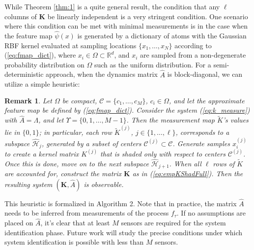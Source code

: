 \documentclass[letterpaper,12pt,peerreviewca,draftcls]{IEEEtran}
\newtheorem{remark}{Remark}
\newcommand{\R}{\mathbb{R}}
\newcommand{\fspace}{\mathcal{H}}
\newcommand{\fmap}{\psi}
\newcommand{\empK}{\ensuremath{K}}
\newcommand{\dom}{\Omega}
\newcommand{\sampSetLong}{\{x_1, \dots, x_{\nsamp}\}}
\newcommand{\nsamp}{N}
\newcommand{\ncent}{M}
\newcommand{\shCent}{\mathcal{C}}
\newcommand{\shCentLong}{\{c_1,\dots,c_{\ncent}\}}
\renewcommand{\eqref}[1]{(\ref{eq:#1})}
\newcommand{\Tset}{\Upsilon}
\newcommand{\JorLa}{\Lambda}
\newcommand{\fspaceApprox}{\widehat{\fspace}}
\newcommand{\fmapApprox}{\widehat{\fmap}}
\newcommand{\minmeas}{\ell}
\newcommand{\measmap}{\widetilde{\empK}}
\newcommand{\fsubspaceC}[1]{\fspaceApprox_{#1}}
\newcommand{\dualop}{A}
\newcommand{\dualopApprox}{\widehat{\dualop}}
\newcommand{\empKShadFull}{\mathbf{\empK}}
\newcommand{\tindex}{\tau}
\begin{document}
While Theorem \ref{thm:1} is a quite general result, the condition that any $\minmeas$ columns of $\empKShadFull$ be linearly independent is a very stringent condition. One scenario where this condition can be met with minimal measurements is in the case when the feature map $\fmapApprox(x)$ is generated by a dictionary of atoms with the Gaussian RBF kernel evaluated at sampling locations $\sampSetLong$ according to \eqref{fmap_dict}, where $x_i\in\dom\subset\R^d$, and $x_i$ are sampled from a non-degenerate probability distribution on $\dom$ such as the uniform distribution. For a semi-deterministic approach, when the dynamics matrix $\dualopApprox$ is block-diagonal, we can utilize a simple heuristic:

\begin{remark}\label{rem:1}
 Let $\dom$ be compact, $\shCent = \shCentLong$, $c_i\in\dom$, and let the approximate feature map be defined by \eqref{fmap_dict}. Consider the system \eqref{k_measure} with $\dualopApprox=\JorLa$, and let $\Tset = \{0,1,\dots,\ncent-1\}$. Then the measurement map $\measmap$'s values lie in $\{0, 1\}$; in particular, each row $\measmap^{(j)}$, $j\in\{1,\dots,\minmeas\}$, corresponds to a subspace $\fsubspaceC{j}$, generated by a subset of centers $\shCent^{(j)}\subset\shCent$. Generate samples $x_i^{(j)}$ to create a kernel matrix $\empK^{(j)}$ that is shaded only with respect to centers $\shCent^{(j)}$. Once this is done, move on to the next subspace $\fsubspaceC{j+1}$. When all $\minmeas$ rows of $\measmap$ are accounted for, construct the matrix $\empKShadFull$ as in \eqref{empKShadFull}. Then the resulting system $(\empKShadFull, \dualopApprox)$ is observable. 
\end{remark}


This heuristic is formalized in Algorithm 2. Note that in practice, the matrix $\dualopApprox$ needs to be inferred from measurements of the process $f_{\tindex}$. If no assumptions are placed on $\dualopApprox$, it's clear that at least $\ncent$ sensors are required for the system identification phase. Future work will study the precise conditions under which system identification is possible with less than $\ncent$ sensors.
\end{document}
